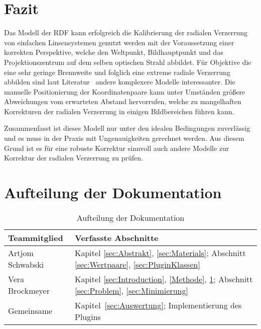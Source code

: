 \section{Fazit} \label{sec:Conclusion}
Das Modell der RDF kann erfolgreich die Kalibrierung der radialen Verzerrung von einfachen Linsensystemen genutzt werden mit der Voraussetzung einer korrekten Perspektive, welche den Weltpunkt, Bildhauptpunkt und das Projektionszentrum auf dem selben optischen Strahl abbildet. Für Objektive die eine sehr geringe Brennweite und folglich eine extreme radiale Verzerrung abbilden sind laut Literatur~\cite{WangRaddist} andere komplexere Modelle interessanter. Die manuelle Positionierung der Koordinatenpaare kann unter Umständen größere Abweichungen vom erwarteten Abstand hervorrufen, welche zu mangelhaften Korrekturen der radialen Verzerrung in einigen Bildbereichen führen kann. 

Zusammenfasst ist dieses Modell nur unter den idealen Bedingungen zuverlässig und es muss in der Praxis mit Ungenauigkeiten gerechnet werden. Aus diesem Grund ist es für eine robuste Korrektur sinnvoll auch andere Modelle zur Korrektur der radialen Verzerrung zu prüfen.
\section{Aufteilung der Dokumentation}
\begin{table}[H]
		\begin{tabular}{|p{} | p{}|} 
			\hline
			\textbf{Teammitglied} & \textbf{Verfasste Abschnitte}\\ \hline
			Artjom Schwabski& Kapitel \ref{sec:Abstrakt}, \ref{sec:Materials}; Abschnitt \ref{sec:Wertpaare}, \ref{sec:PluginKlassen} \\ \hline
			Vera Brockmeyer & Kapitel \ref{sec:Introduction}, \ref{Methode}, \ref{sec:Conclusion}; Abschnitt \ref{sec:Problem}, \ref{sec:Minimierung} \\ \hline
			Gemeinsame & Kapitel~\ref{sec:Auswertung}; Implementierung des Plugins\\ \hline
		\end{tabular}
		\caption{Aufteilung der Dokumentation}
\end{table}

























